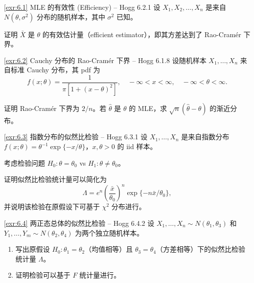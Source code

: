 
\begin{exercise}{\ref{exr:6.1} MLE 的有效性 (Efficiency) – Hogg 6.2.1}\label{exr:6.1}
设 $X_1, X_2, \ldots, X_n$ 是来自 $N(\theta, \sigma^2)$ 分布的随机样本，其中 $\sigma^2$ 已知。

证明 $\bar{X}$ 是 $\theta$ 的有效估计量（efficient estimator），即其方差达到了 Rao-Cramér 下界。

\end{exercise}

\begin{exercise}{\ref{exr:6.2} Cauchy 分布的 Rao-Cramér 下界 – Hogg 6.1.8}\label{exr:6.2}
设随机样本 $X_1, \ldots, X_n$ 来自标准 Cauchy 分布，其 pdf 为
\[
f(x; \theta) = \frac{1}{\pi[1+(x-\theta)^2]}, \quad -\infty < x < \infty, \quad -\infty < \theta < \infty .
\]

证明 Rao-Cramér 下界为 $2/n$。若 $\widehat{\theta}$ 是 $\theta$ 的 MLE，求 $\sqrt{n}(\widehat{\theta} - \theta)$ 的渐近分布。

\end{exercise}

\begin{exercise}{\ref{exr:6.3} 指数分布的似然比检验 – Hogg 6.3.1}\label{exr:6.3}
设 $X_1, \ldots, X_n$ 是来自指数分布 $f(x; \theta) = \theta^{-1}\exp\{-x/\theta\}$，$x, \theta > 0$ 的 iid 样本。

考虑检验问题 $H_0: \theta = \theta_0$ vs $H_1: \theta \neq \theta_0$。

证明似然比检验统计量可以简化为
\[
\Lambda = e^n \left(\frac{\bar{x}}{\theta_0}\right)^n \exp\{-n\bar{x}/\theta_0\},
\]
并说明该检验在原假设下可基于 $\chi^2$ 分布进行。

\end{exercise}

\begin{exercise}{\ref{exr:6.4} 两正态总体的似然比检验 – Hogg 6.4.2}\label{exr:6.4}
设 $X_1, \ldots, X_n \sim N(\theta_1, \theta_3)$ 和 $Y_1, \ldots, Y_m \sim N(\theta_2, \theta_4)$ 为两个独立随机样本。

\begin{enumerate}
\item 写出原假设 $H_0: \theta_1 = \theta_2$（均值相等）且 $\theta_3 = \theta_4$（方差相等）下的似然比检验统计量 $\Lambda$。
\item 证明检验可以基于 $F$ 统计量进行。
\end{enumerate}

\end{exercise}

